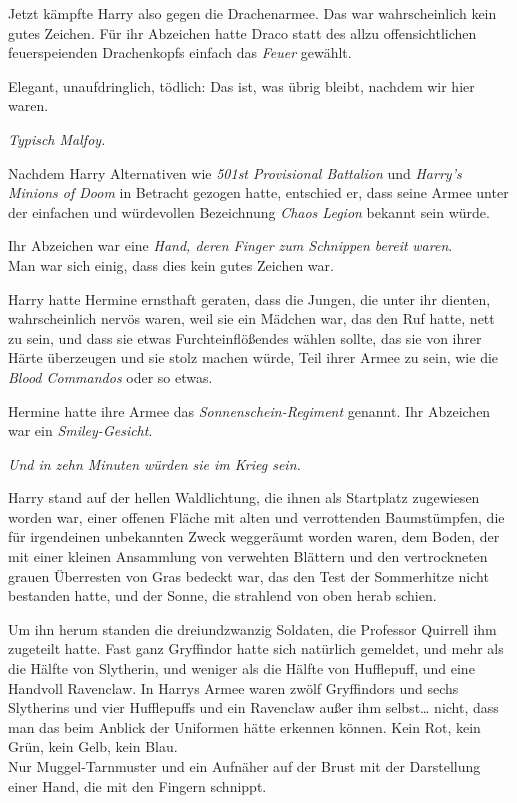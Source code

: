 {Jetzt kämpfte Harry also gegen die Drachenarmee. Das war wahrscheinlich kein gutes Zeichen. Für ihr Abzeichen hatte Draco statt des allzu offensichtlichen feuerspeienden Drachenkopfs einfach das \emph{Feuer} gewählt.

Elegant, unaufdringlich, tödlich: Das ist, was übrig bleibt, nachdem wir hier waren.

\emph{Typisch Malfoy.}

Nachdem Harry Alternativen wie \emph{501st Provisional Battalion} und \emph{Harry's Minions of Doom} in Betracht gezogen hatte, entschied er, dass seine Armee unter der einfachen und würdevollen Bezeichnung \emph{Chaos Legion} bekannt sein würde.

Ihr Abzeichen war eine \emph{Hand, deren Finger zum Schnippen bereit} \emph{waren}.\\ Man war sich einig, dass dies kein gutes Zeichen war.

Harry hatte Hermine ernsthaft geraten, dass die Jungen, die unter ihr dienten, wahrscheinlich nervös waren, weil sie ein Mädchen war, das den Ruf hatte, nett zu sein, und dass sie etwas Furchteinflößendes wählen sollte, das sie von ihrer Härte überzeugen und sie stolz machen würde, Teil ihrer Armee zu sein, wie die \emph{Blood Commandos} oder so etwas.

Hermine hatte ihre Armee das \emph{Sonnenschein-Regiment} genannt. Ihr Abzeichen war ein \emph{Smiley-Gesicht}.

\emph{Und in zehn Minuten würden sie im Krieg sein.}

Harry stand auf der hellen Waldlichtung, die ihnen als Startplatz zugewiesen worden war, einer offenen Fläche mit alten und verrottenden Baumstümpfen, die für irgendeinen unbekannten Zweck weggeräumt worden waren, dem Boden, der mit einer kleinen Ansammlung von verwehten Blättern und den vertrockneten grauen Überresten von Gras bedeckt war, das den Test der Sommerhitze nicht bestanden hatte, und der Sonne, die strahlend von oben herab schien.

Um ihn herum standen die dreiundzwanzig Soldaten, die Professor Quirrell ihm zugeteilt hatte. Fast ganz Gryffindor hatte sich natürlich gemeldet, und mehr als die Hälfte von Slytherin, und weniger als die Hälfte von Hufflepuff, und eine Handvoll Ravenclaw. In Harrys Armee waren zwölf Gryffindors und sechs Slytherins und vier Hufflepuffs und ein Ravenclaw außer ihm selbst… nicht, dass man das beim Anblick der Uniformen hätte erkennen können. Kein Rot, kein Grün, kein Gelb, kein Blau.\\ Nur Muggel-Tarnmuster und ein Aufnäher auf der Brust mit der Darstellung einer Hand, die mit den Fingern schnippt.

}
